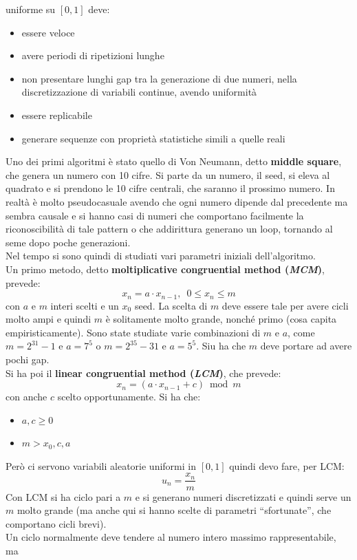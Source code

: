 \documentclass[a4paper,12pt, oneside]{book}
\begin{document}
uniforme su $[0,1]$ deve:
\begin{itemize}
  \item essere veloce
  \item avere periodi di ripetizioni lunghe
  \item non presentare lunghi gap tra la generazione di due numeri, nella
  discretizzazione di variabili continue, avendo uniformità
  \item essere replicabile
 \item generare sequenze con proprietà statistiche simili a quelle reali
\end{itemize}
Uno dei primi algoritmi è stato quello di Von Neumann, detto \textbf{middle
  square}, che genera un numero con 10 cifre. Si parte da un numero, il seed, si
eleva al 
quadrato e si prendono le 10 cifre centrali, che saranno il prossimo numero. In
realtà è molto pseudocasuale avendo che ogni numero dipende dal precedente ma
sembra causale e si hanno casi di numeri che comportano facilmente la
riconoscibilità di tale pattern o che addirittura generano un loop, tornando al
seme dopo poche generazioni.  \\
Nel tempo si sono quindi di studiati vari parametri iniziali dell'algoritmo. \\
Un primo metodo, detto \textbf{moltiplicative congruential method
  (\textit{MCM})}, prevede: 
\[x_n=a\cdot x_{n-1},\,\,\,0\leq x_n\leq m\]
con $a$ e $m$ interi scelti e un $x_0$ seed. La scelta di $m$ deve essere tale
per avere cicli molto ampi e quindi $m$ è solitamente molto grande, nonché primo
(cosa capita empiristicamente). Sono state studiate varie combinazioni di $m$ e
$a$, come $m=2^{31}-1$ e $a=7^5$ o $m=2^{35}-31$ e $a=5^5$. Siu ha che $m$ deve
portare ad avere pochi gap.\\
Si ha poi il \textbf{linear congruential method (\textit{LCM})}, che prevede:
\[x_n=(a\cdot x_{n-1}+c)\bmod m\]
con anche $c$ scelto opportunamente. Si ha che:
\begin{itemize}
  \item $a,c\geq 0$
  \item $m>x_0,c,a$
\end{itemize}
Però ci servono variabili aleatorie uniformi in $[0,1]$ quindi devo fare, per
LCM: 
\[u_n=\frac{x_n}{m}\]
Con LCM si ha ciclo pari a $m$ e si generano numeri discretizzati e quindi serve
un $m$ molto grande (ma anche qui si hanno scelte di parametri ``sfortunate'',
che comportano cicli brevi).\\
Un ciclo normalmente deve tendere al numero intero massimo rappresentabile, ma
\end{document}
